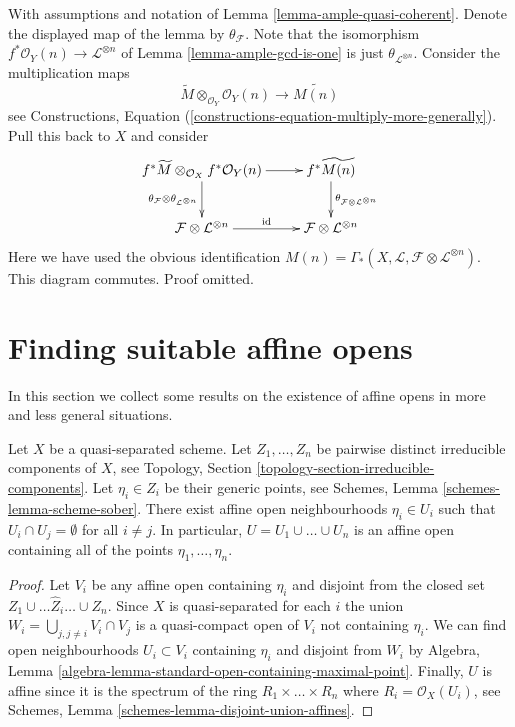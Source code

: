 \begin{remark}
\label{remark-neurotic}
With assumptions and notation of Lemma \ref{lemma-ample-quasi-coherent}.
Denote the displayed map of the lemma by $\theta_{\mathcal{F}}$.
Note that the isomorphism $f^*\mathcal{O}_Y(n) \to \mathcal{L}^{\otimes n}$
of Lemma \ref{lemma-ample-gcd-is-one} is just
$\theta_{\mathcal{L}^{\otimes n}}$.
Consider the multiplication maps 
$$
\widetilde{M} \otimes_{\mathcal{O}_Y} \mathcal{O}_Y(n) 
\longrightarrow
\widetilde{M(n)}
$$
see
Constructions, Equation (\ref{constructions-equation-multiply-more-generally}).
Pull this back to $X$ and consider
$$
\xymatrix{
f^*\widetilde{M} \otimes_{\mathcal{O}_X} f^*\mathcal{O}_Y(n)
\ar[r]
\ar[d]_{\theta_{\mathcal{F}} \otimes \theta_{\mathcal{L}^{\otimes n}}}
&
f^*\widetilde{M(n)}
\ar[d]^{\theta_{\mathcal{F}\otimes \mathcal{L}^{\otimes n}}}
\\
\mathcal{F} \otimes \mathcal{L}^{\otimes n} \ar[r]^{\text{id}} &
\mathcal{F} \otimes \mathcal{L}^{\otimes n}
}
$$
Here we have used the obvious identification
$M(n) = \Gamma_*(X, \mathcal{L}, \mathcal{F} \otimes \mathcal{L}^{\otimes n})$.
This diagram commutes. Proof omitted.
\end{remark}



\section{Finding suitable affine opens}
\label{section-finding-affine-opens}

\noindent
In this section we collect some results on the existence of
affine opens in more and less general situations.

\begin{lemma}
\label{lemma-maximal-points-affine}
Let $X$ be a quasi-separated scheme.
Let $Z_1, \ldots, Z_n$ be pairwise distinct irreducible components of $X$,
see Topology, Section \ref{topology-section-irreducible-components}.
Let $\eta_i \in Z_i$ be their generic points, see
Schemes, Lemma \ref{schemes-lemma-scheme-sober}.
There exist affine open neighbourhoods $\eta_i \in U_i$
such that $U_i \cap U_j = \emptyset$ for all $i \not = j$.
In particular, $U = U_1 \cup \ldots \cup U_n$ is an affine
open containing all of the points $\eta_1, \ldots, \eta_n$.
\end{lemma}

\begin{proof}
Let $V_i$ be any affine open containing $\eta_i$
and disjoint from the closed set $Z_1 \cup \ldots \hat Z_i \ldots \cup Z_n$.
Since $X$ is quasi-separated for each $i$ the union
$W_i = \bigcup_{j, j \not = i} V_i \cap V_j$ is a quasi-compact
open of $V_i$ not containing $\eta_i$.
We can find open neighbourhoods $U_i \subset V_i$
containing $\eta_i$ and disjoint from $W_i$ by
Algebra, Lemma \ref{algebra-lemma-standard-open-containing-maximal-point}.
Finally, $U$ is affine since it is the spectrum of
the ring $R_1 \times \ldots \times R_n$ where $R_i = \mathcal{O}_X(U_i)$,
see Schemes, Lemma \ref{schemes-lemma-disjoint-union-affines}.
\end{proof}


